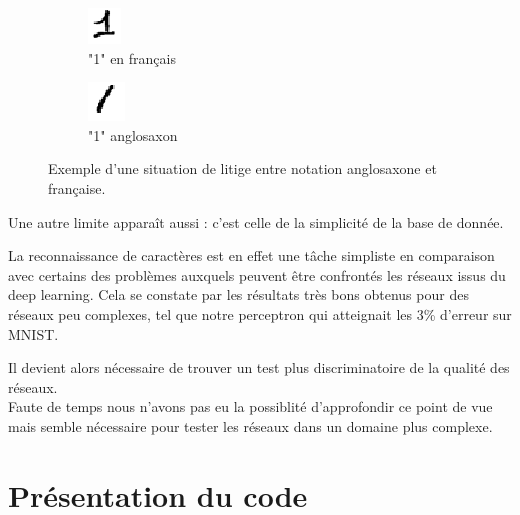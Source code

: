 \documentclass[a4paper,oneside]{report}
\begin{document}
                \begin{figure}
                    \centering
                    \begin{subfigure}[b]{0.3\textwidth}
                        \centering
                        \includegraphics{Images/mnist-02.png}
                        \caption{"1" en français}
                    \end{subfigure}
                    \hfill
                    \begin{subfigure}[b]{0.3\textwidth}
                        \centering
                        \includegraphics{Images/mnist-03.png}
                        \caption{"1" anglosaxon}
                    \end{subfigure}
                    \caption{Exemple d'une situation de litige entre notation anglosaxone et française.}
                \end{figure}

                Une autre limite apparaît aussi : c'est celle de la simplicité de la base de donnée.

                La reconnaissance de caractères est en effet une tâche simpliste en comparaison avec 
certains des problèmes auxquels peuvent être confrontés les réseaux issus du deep 
learning. Cela se constate par 
les résultats très bons obtenus pour des réseaux peu complexes, tel que notre perceptron qui 
atteignait les 3\% d'erreur sur MNIST.

                Il devient alors nécessaire de trouver un test plus discriminatoire de la qualité des 
réseaux.\\

                Faute de temps nous n'avons pas eu la possiblité d'approfondir ce point de vue mais 
semble nécessaire pour tester les réseaux dans un domaine plus complexe.

        \chapter{Présentation du code}
\end{document}
